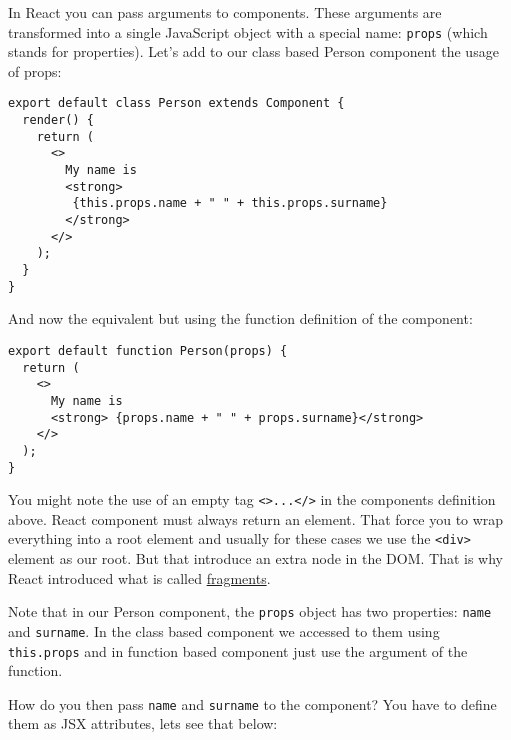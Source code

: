 \documentclass[a4paper, oneside, titlepage, 12pt]{book}
\begin{document}
In React you can pass arguments to components. These arguments are transformed into a single JavaScript object with a special name: \texttt{props} (which stands for properties). Let's add to our class based Person component the usage of props:

\begin{verbatim}
export default class Person extends Component {
  render() {
    return (
      <>
        My name is 
        <strong> 
         {this.props.name + " " + this.props.surname}
        </strong>
      </>
    );
  }
}
\end{verbatim}

And now the equivalent but using the function definition of the component:

\begin{verbatim}
export default function Person(props) {
  return (
    <>
      My name is 
      <strong> {props.name + " " + props.surname}</strong>
    </>
  );
}
\end{verbatim}

\begin{displayquote}
{\small You might note the use of an empty tag \texttt{<>...</>} in the components definition above. React component must always return an element. That force you to wrap everything into a root element and usually for these cases we use the \texttt{<div>} element as our root. But that introduce an extra node in the DOM. That is why React introduced what is called \href{https://reactjs.org/docs/fragments.html}{fragments}.}
\end{displayquote}

Note that in our Person component, the \texttt{props} object has two properties: \texttt{name} and \texttt{surname}. In the class based component we accessed to them using \texttt{this.props} and in function based component just use the argument of the function.
\newline

How do you then pass \texttt{name} and \texttt{surname} to the component? You have to define them as JSX attributes, lets see that below:
\end{document}
